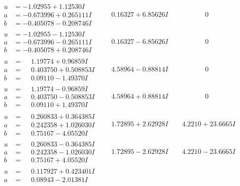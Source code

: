 \documentclass[1p]{elsarticle_modified}
\theoremstyle{definition}
\begin{document}
$$\begin{array}{c|c|c}
\begin{aligned}
u &= -1.02955 + 1.12530 I \\
a &= -0.673996 + 0.265111 I \\
b &= -0.405078 - 0.208746 I\end{aligned}
 & \phantom{-}0.16327 + 6.85626 I & \phantom{-0.000000 } 0 \\ \hline\begin{aligned}
u &= -1.02955 - 1.12530 I \\
a &= -0.673996 - 0.265111 I \\
b &= -0.405078 + 0.208746 I\end{aligned}
 & \phantom{-}0.16327 - 6.85626 I & \phantom{-0.000000 } 0 \\ \hline\begin{aligned}
u &= \phantom{-}1.19774 + 0.96859 I \\
a &= \phantom{-}0.403750 + 0.508853 I \\
b &= \phantom{-}0.09110 - 1.49370 I\end{aligned}
 & \phantom{-}4.58964 - 0.88814 I & \phantom{-0.000000 } 0 \\ \hline\begin{aligned}
u &= \phantom{-}1.19774 - 0.96859 I \\
a &= \phantom{-}0.403750 - 0.508853 I \\
b &= \phantom{-}0.09110 + 1.49370 I\end{aligned}
 & \phantom{-}4.58964 + 0.88814 I & \phantom{-0.000000 } 0 \\ \hline\begin{aligned}
u &= \phantom{-}0.260833 + 0.364385 I \\
a &= \phantom{-}0.242358 + 1.026030 I \\
b &= \phantom{-}0.75167 - 4.05520 I\end{aligned}
 & \phantom{-}1.72895 + 2.62928 I & \phantom{-}4.2210 + 23.6665 I \\ \hline\begin{aligned}
u &= \phantom{-}0.260833 - 0.364385 I \\
a &= \phantom{-}0.242358 - 1.026030 I \\
b &= \phantom{-}0.75167 + 4.05520 I\end{aligned}
 & \phantom{-}1.72895 - 2.62928 I & \phantom{-}4.2210 - 23.6665 I \\ \hline\begin{aligned}
u &= \phantom{-}0.117927 + 0.423401 I \\
a &= \phantom{-}0.08943 - 2.01381 I \\

\end{aligned}
\end{array}$$
\end{document}
